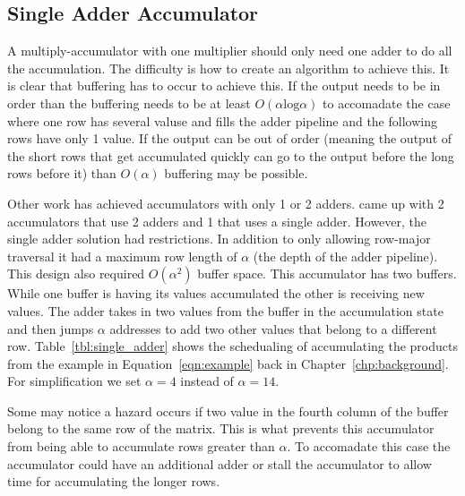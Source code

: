 \subsection{Single Adder Accumulator}
A multiply-accumulator with one multiplier should only need one adder to do all the accumulation. The difficulty is how to create an algorithm to achieve this. It is clear that buffering has to occur to achieve this. If the output needs to be in order than the buffering needs to be at least $O(\alpha\textrm{log}\alpha)$ to accomadate the case where one row has several valuse and fills the adder pipeline and the following rows have only 1 value. If the output can be out of order (meaning the output of the short rows that get accumulated quickly can go to the output before the long rows before it) than $O(\alpha)$ buffering may be possible.

Other work has achieved accumulators with only 1 or 2 adders. \cite{prelim:zhuo} came up with 2 accumulators that use 2 adders and 1 that uses a single adder. However, the single adder solution had restrictions. In addition to only allowing row-major traversal it had a maximum row length of $\alpha$ (the depth of the adder pipeline). This design also required $O(\alpha^2)$ buffer space. This accumulator has two buffers. While one buffer is having its values accumulated the other is receiving new values. The adder takes in two values from the buffer in the accumulation state and then jumps $\alpha$ addresses to add two other values that belong to a different row. Table~\ref{tbl:single_adder} shows the schedualing of accumulating the products from the example in Equation~\ref{eqn:example} back in Chapter~\ref{chp:background}. For simplification we set $\alpha = 4$ instead of $\alpha = 14$.

Some may notice a hazard occurs if two value in the fourth column of the buffer belong to the same row of the matrix. This is what prevents this accumulator from being able to accumulate rows greater than $\alpha$. To accomadate this case the accumulator could have an additional adder or stall the accumulator to allow time for accumulating the longer rows.


